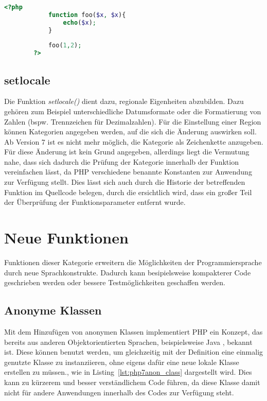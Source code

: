     \begin{lstlisting}[language=php, caption={Beispiel meherer gleichnamiger Funktionsparameter}, label={lst:php5parameter}]
        <?php
            function foo($x, $x){
                echo($x);
            }
            
            foo(1,2);
        ?>
    \end{lstlisting}

    \subsection{setlocale}\label{setlocale_speed}
    Die Funktion \textit{setlocale()} dient dazu, regionale Eigenheiten abzubilden. Dazu gehören zum Beispiel unterschiedliche Datumsformate oder die Formatierung von 
    Zahlen (bspw. Trennzeichen für Dezimalzahlen). Für die Einstellung einer Region können Kategorien angegeben werden, auf die sich die Änderung auswirken soll. 
    Ab Version 7 ist es nicht mehr möglich, die Kategorie als Zeichenkette anzugeben. Für diese Änderung ist kein Grund angegeben, allerdings liegt die Vermutung
    nahe, dass sich dadurch die Prüfung der Kategorie innerhalb der Funktion vereinfachen lässt, da \acs{PHP} verschiedene benannte Konstanten zur Anwendung zur Verfügung 
    stellt. Dies lässt sich auch durch die Historie der betreffenden Funktion im Quellcode belegen, durch die ersichtlich wird, dass ein großer Teil der Überprüfung
    der Funktionsparameter entfernt wurde. \cite{nikic_remove_2014}

\section{Neue Funktionen}
    Funktionen dieser Kategorie erweitern die Möglichkeiten der Programmiersprache durch neue Sprachkonstrukte. Dadurch kann besipielsweise 
    kompakterer Code geschrieben werden oder bessere Testmöglichkeiten geschaffen werden.

    \subsection{Anonyme Klassen}
    Mit dem Hinzufügen von anonymen Klassen implementiert \acs{PHP} ein Konzept, das bereits aus anderen Objektorientierten Sprachen, beispielsweise Java 
    \cite{oracle_anonymous_nodate}, bekannt ist. Diese können benutzt werden, um gleichzeitig mit der Definition eine einmalig genutzte Klasse zu instanziieren, ohne eigens 
    dafür eine neue lokale Klasse erstellen zu müssen., wie in Listing~\ref{lst:php7anon_class} dargestellt wird. Dies kann zu kürzerem und besser verständlichem 
    Code führen, da diese Klasse damit nicht für andere Anwendungen innerhalb des Codes zur Verfügung steht.

